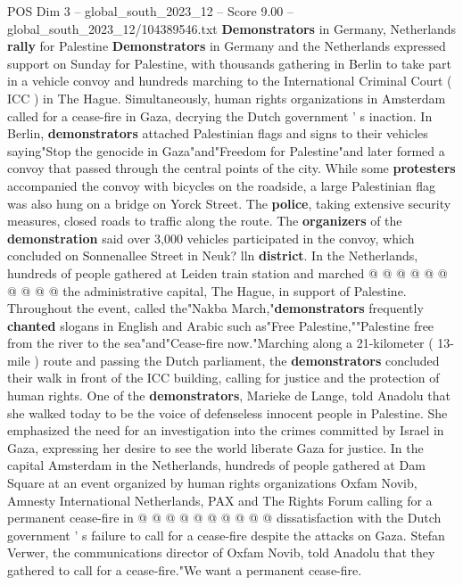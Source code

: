 \begin{textsample}{POS Dim 3 – global\_south\_2023\_12 – Score 9.00 – global\_south\_2023\_12/104389546.txt}  \label{ex:f3_pos_419}
\textbf{Demonstrators} in Germany, Netherlands \textbf{rally} for Palestine \textbf{Demonstrators} in Germany and the Netherlands expressed support on Sunday for Palestine, with thousands gathering in Berlin to take part in a vehicle convoy and hundreds marching to the International Criminal Court ( ICC ) in The Hague.
Simultaneously, human rights organizations in Amsterdam called for a cease-fire in Gaza, decrying the Dutch government ' s inaction.
In Berlin, \textbf{demonstrators} attached Palestinian flags and signs to their vehicles saying"Stop the genocide in Gaza"and"Freedom for Palestine"and later formed a convoy that passed through the central points of the city.
While some \textbf{protesters} accompanied the convoy with bicycles on the roadside, a large Palestinian flag was also hung on a bridge on Yorck Street.
The \textbf{police}, taking extensive security measures, closed roads to traffic along the route.
The \textbf{organizers} of the \textbf{demonstration} said over 3,000 vehicles participated in the convoy, which concluded on Sonnenallee Street in Neuk? lln \textbf{district}.
In the Netherlands, hundreds of people gathered at Leiden train station and marched @ @ @ @ @ @ @ @ @ @ the administrative capital, The Hague, in support of Palestine.
Throughout the event, called the"Nakba March,"\textbf{demonstrators} frequently \textbf{chanted} slogans in English and Arabic such as"Free Palestine,""Palestine free from the river to the sea"and"Cease-fire now."Marching along a 21-kilometer ( 13-mile ) route and passing the Dutch parliament, the \textbf{demonstrators} concluded their walk in front of the ICC building, calling for justice and the protection of human rights.
One of the \textbf{demonstrators}, Marieke de Lange, told Anadolu that she walked today to be the voice of defenseless innocent people in Palestine.
She emphasized the need for an investigation into the crimes committed by Israel in Gaza, expressing her desire to see the world liberate Gaza for justice.
In the capital Amsterdam in the Netherlands, hundreds of people gathered at Dam Square at an event organized by human rights organizations Oxfam Novib, Amnesty International Netherlands, PAX and The Rights Forum calling for a permanent cease-fire in @ @ @ @ @ @ @ @ @ @ dissatisfaction with the Dutch government ' s failure to call for a cease-fire despite the attacks on Gaza.
Stefan Verwer, the communications director of Oxfam Novib, told Anadolu that they gathered to call for a cease-fire."We want a permanent cease-fire.

\end{textsample}
